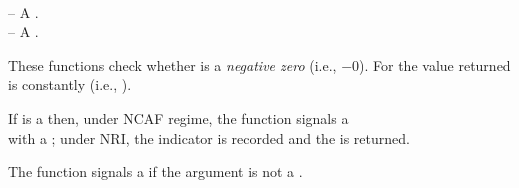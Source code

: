\documentclass[../Comparisons-Predicates.tex]{subfiles}
\begin{document}
  
  
  \DSyntax{}
  
    \RArrow {}\\
    \RArrow {}
  
  \DArgsNValues{}
  
   -- A .\\
   -- A .
  
  
  \DDescription{}
  
  These functions check whether  is a \emph{negative zero}
  (i.e., $-0$).  For \CL{} the value returned is constantly 
  (i.e., ).
  
  \DExceptional{}
  
  If  is a  then, under NCAF regime, the
  function signals a\\
   with a
   ; under NRI, the
   indicator is recorded and the   is returned.
  
  The function signals a  if the argument 
  is not a .
  
\end{document}

